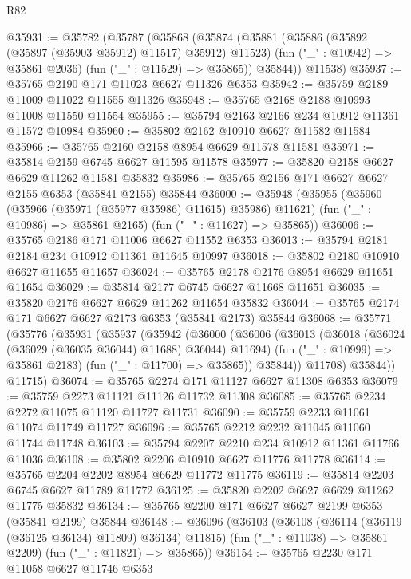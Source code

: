 \begin{lexlean}{R82}
\begin{coremodule}
@35931 := @35782
    (@35787
      (@35868
        (@35874
          (@35881
            (@35886 (@35892 (@35897 (@35903 @35912) @11517) @35912) @11523)
            (fun ("_" : @10942) => @35861 @2036)
            (fun ("_" : @11529) => @35865))
          @35844))
      @11538)
@35937 := @35765 @2190 @171 @11023 @6627 @11326 @6353
@35942 := @35759 @2189 @11009 @11022 @11555 @11326
@35948 := @35765 @2168 @2188 @10993 @11008 @11550 @11554
@35955 := @35794 @2163 @2166 @234 @10912 @11361 @11572 @10984
@35960 := @35802 @2162 @10910 @6627 @11582 @11584
@35966 := @35765 @2160 @2158 @8954 @6629 @11578 @11581
@35971 := @35814 @2159 @6745 @6627 @11595 @11578
@35977 := @35820 @2158 @6627 @6629 @11262 @11581 @35832
@35986 := @35765 @2156 @171 @6627 @6627 @2155 @6353 (@35841 @2155) @35844
@36000 := @35948
    (@35955
      (@35960 (@35966 (@35971 (@35977 @35986) @11615) @35986) @11621)
      (fun ("_" : @10986) => @35861 @2165)
      (fun ("_" : @11627) => @35865))
@36006 := @35765 @2186 @171 @11006 @6627 @11552 @6353
@36013 := @35794 @2181 @2184 @234 @10912 @11361 @11645 @10997
@36018 := @35802 @2180 @10910 @6627 @11655 @11657
@36024 := @35765 @2178 @2176 @8954 @6629 @11651 @11654
@36029 := @35814 @2177 @6745 @6627 @11668 @11651
@36035 := @35820 @2176 @6627 @6629 @11262 @11654 @35832
@36044 := @35765 @2174 @171 @6627 @6627 @2173 @6353 (@35841 @2173) @35844
@36068 := @35771
    (@35776
      (@35931
        (@35937
          (@35942
            (@36000
              (@36006
                (@36013
                  (@36018 (@36024 (@36029 (@36035 @36044) @11688) @36044) @11694)
                  (fun ("_" : @10999) => @35861 @2183)
                  (fun ("_" : @11700) => @35865))
                @35844))
            @11708)
          @35844))
      @11715)
@36074 := @35765 @2274 @171 @11127 @6627 @11308 @6353
@36079 := @35759 @2273 @11121 @11126 @11732 @11308
@36085 := @35765 @2234 @2272 @11075 @11120 @11727 @11731
@36090 := @35759 @2233 @11061 @11074 @11749 @11727
@36096 := @35765 @2212 @2232 @11045 @11060 @11744 @11748
@36103 := @35794 @2207 @2210 @234 @10912 @11361 @11766 @11036
@36108 := @35802 @2206 @10910 @6627 @11776 @11778
@36114 := @35765 @2204 @2202 @8954 @6629 @11772 @11775
@36119 := @35814 @2203 @6745 @6627 @11789 @11772
@36125 := @35820 @2202 @6627 @6629 @11262 @11775 @35832
@36134 := @35765 @2200 @171 @6627 @6627 @2199 @6353 (@35841 @2199) @35844
@36148 := @36096
    (@36103
      (@36108 (@36114 (@36119 (@36125 @36134) @11809) @36134) @11815)
      (fun ("_" : @11038) => @35861 @2209)
      (fun ("_" : @11821) => @35865))
@36154 := @35765 @2230 @171 @11058 @6627 @11746 @6353

\end{coremodule}
\end{lexlean}
